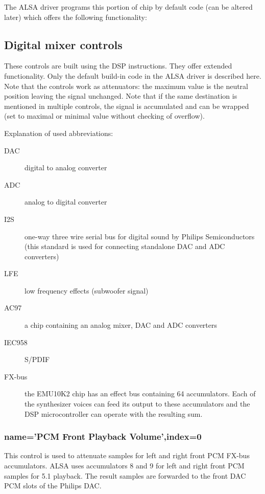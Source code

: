 \documentclass[a4paper,8pt,english]{sphinxmanual}
\begin{document}
The ALSA driver programs this portion of chip by default code
(can be altered later) which offers the following functionality:


\subsection{Digital mixer controls}
\label{sound/cards/audigy-mixer:digital-mixer-controls}
These controls are built using the DSP instructions. They offer extended
functionality. Only the default build-in code in the ALSA driver is described
here. Note that the controls work as attenuators: the maximum value is the
neutral position leaving the signal unchanged. Note that if the  same destination
is mentioned in multiple controls, the signal is accumulated and can be wrapped
(set to maximal or minimal value without checking of overflow).

Explanation of used abbreviations:
\begin{description}
\item[{DAC}] \leavevmode
digital to analog converter

\item[{ADC}] \leavevmode
analog to digital converter

\item[{I2S}] \leavevmode
one-way three wire serial bus for digital sound by Philips Semiconductors
(this standard is used for connecting standalone DAC and ADC converters)

\item[{LFE}] \leavevmode
low frequency effects (subwoofer signal)

\item[{AC97}] \leavevmode
a chip containing an analog mixer, DAC and ADC converters

\item[{IEC958}] \leavevmode
S/PDIF

\item[{FX-bus}] \leavevmode
the EMU10K2 chip has an effect bus containing 64 accumulators.
Each of the synthesizer voices can feed its output to these accumulators
and the DSP microcontroller can operate with the resulting sum.

\end{description}


\subsubsection{name='PCM Front Playback Volume',index=0}
\label{sound/cards/audigy-mixer:name-pcm-front-playback-volume-index-0}
This control is used to attenuate samples for left and right front PCM FX-bus
accumulators. ALSA uses accumulators 8 and 9 for left and right front PCM
samples for 5.1 playback. The result samples are forwarded to the front DAC PCM
slots of the Philips DAC.
\end{document}
